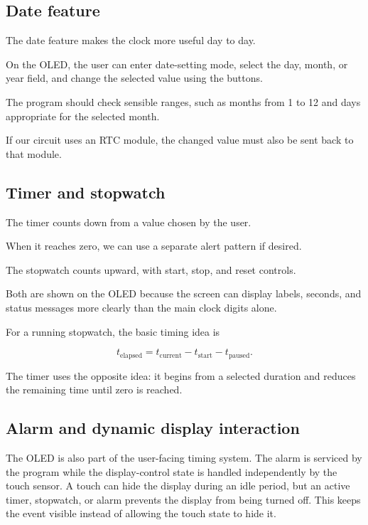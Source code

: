 \documentclass[12pt,letterpaper]{article}
\begin{document}
\subsection{Date feature}

The date feature makes the clock more useful
day to day.

On the OLED,
the user can enter date-setting mode,
select the day,
month,
or year field,
and change the selected value using the buttons.

The program should check sensible ranges,
such as months from 1 to 12
and days appropriate for the selected month.

If our circuit uses an RTC module,
the changed value must also be sent
back to that module.

\subsection{Timer and stopwatch}

The timer counts down from a value
chosen by the user.

When it reaches zero,
we can use a separate alert pattern if desired.

The stopwatch counts upward,
with start,
stop,
and reset controls.

Both are shown on the OLED
because the screen can display labels,
seconds,
and status messages more clearly
than the main clock digits alone.

For a running stopwatch,
the basic timing idea is

\[
t_{\text{elapsed}}
=
t_{\text{current}}
-
t_{\text{start}}
-
t_{\text{paused}}.
\]

The timer uses the opposite idea:
it begins from a selected duration
and reduces the remaining time
until zero is reached.

\subsection{Alarm and dynamic display interaction}

The OLED is also part of the user-facing timing system. The alarm is serviced
by the program while the display-control state is handled independently by
the touch sensor. A touch can hide the display during an idle period, but an
active timer, stopwatch, or alarm prevents the display from being turned off.
This keeps the event visible instead of allowing the touch state to hide it.
\end{document}
